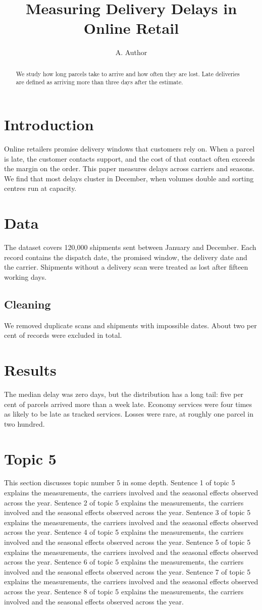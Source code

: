 \documentclass[twocolumn,10pt]{article}
\title{Measuring Delivery Delays in Online Retail}
\author{A. Author}
\begin{document}
\maketitle
\begin{abstract}
We study how long parcels take to arrive and how often they are lost. Late deliveries are defined as arriving more than three days after the estimate.
\end{abstract}
\section{Introduction}
Online retailers promise delivery windows that customers rely on. When a parcel is late, the customer contacts support, and the cost of that contact often exceeds the margin on the order. This paper measures delays across carriers and seasons. We find that most delays cluster in December, when volumes double and sorting centres run at capacity.
\section{Data}
The dataset covers 120{,}000 shipments sent between January and December. Each record contains the dispatch date, the promised window, the delivery date and the carrier. Shipments without a delivery scan were treated as lost after fifteen working days.
\subsection{Cleaning}
We removed duplicate scans and shipments with impossible dates. About two per cent of records were excluded in total.
\section{Results}
The median delay was zero days, but the distribution has a long tail: five per cent of parcels arrived more than a week late. Economy services were four times as likely to be late as tracked services. Losses were rare, at roughly one parcel in two hundred.
\section{Topic 5}
This section discusses topic number 5 in some depth. Sentence 1 of topic 5 explains the measurements, the carriers involved and the seasonal effects observed across the year. Sentence 2 of topic 5 explains the measurements, the carriers involved and the seasonal effects observed across the year. Sentence 3 of topic 5 explains the measurements, the carriers involved and the seasonal effects observed across the year. Sentence 4 of topic 5 explains the measurements, the carriers involved and the seasonal effects observed across the year. Sentence 5 of topic 5 explains the measurements, the carriers involved and the seasonal effects observed across the year. Sentence 6 of topic 5 explains the measurements, the carriers involved and the seasonal effects observed across the year. Sentence 7 of topic 5 explains the measurements, the carriers involved and the seasonal effects observed across the year. Sentence 8 of topic 5 explains the measurements, the carriers involved and the seasonal effects observed across the year.
\end{document}
